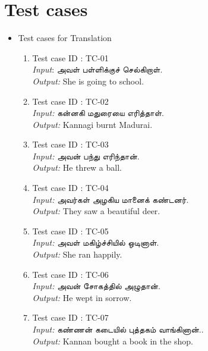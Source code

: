 \documentclass{article}
\begin{document}
\newpage
\section {Test cases}\large
\begin{itemize}
\item Test cases for Translation
\begin{enumerate}
\item Test case ID : TC-01\\
      \textit{Input}:\texttamil{ அவள்  பள்ளிக்குச் செல்கிறாள்.}\\
      \textit{Output:} She is going to school.\\

\item Test case ID : TC-02\\
      \textit{Input:}\texttamil{ கன்னகி  மதுரையை எரித்தாள்.}\\
      \textit{Output:} Kannagi burnt Madurai.\\
      
\item Test case ID : TC-03\\
      \textit{Input:} \texttamil{அவன் பந்து எரிந்தான்}.\\
      \textit{Output:} He threw a ball. \\
      
\item Test case ID : TC-04\\
      \textit{Input:} \texttamil{அவர்கள் அழகிய மானைக் கண்டனர்}.\\
      \textit{Output:} They saw a beautiful deer. \\

\item Test case ID : TC-05\\
      \textit{Input:} \texttamil{அவள் மகிழ்ச்சியில் ஒடினாள்.}\\
      \textit{Output:} She ran happily. \\

\item Test case ID : TC-06\\
      \textit{Input:} \texttamil{அவன் சோகத்தில் அழுதான்.}\\
      \textit{Output:} He wept in sorrow. \\

\item Test case ID : TC-07\\
      \textit{Input:} \texttamil{கண்ணன் கடையில் புத்தகம் வாங்கினான்..}\\
      \textit{Output:} Kannan bought a book in the shop. \\
    

\end{enumerate}
\end{itemize}
\end{document}
